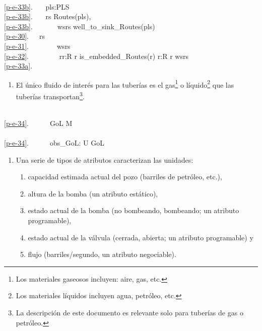 \bp
\>\ \\
\ref{p-e-33b}.\ \ \ {\ALL} pls:PLS {\RDOT}\\
\ref{p-e-33b}.\ \ \  rs {\EQ} Routes(pls),\\
\ref{p-e-33b}.\ \ \ \ \ \ \ wsrs {\EQ} well\_to\_sink\_Routes(pls) \\
\ref{p-e-30}.\ \ \ rs {\EQ} \\
\ref{p-e-31}.\ \ \ \ \ \ \ \ wsrs {\UNION}\\
\ref{p-e-32}.\ \ \ \ \ \ \ \ {\UNION} {\LBRACE}{\LBRACE}r{\PRIM}{\BAR}r{\PRIM}:R {\RDOT} r{\PRIM} {\ISIN} is\_embedded\_Routes(r{\PRIM}{\PRIM}){\RBRACE} {\BAR} r{\PRIM}{\PRIM}:R {\RDOT} r{\PRIM}{\PRIM} {\ISIN} wsrs{\RBRACE}\\
\ref{p-e-33a}.\ \ \ 
\ep
{}

\begin{enumerate}\setei
\item \label{p-e-34} El único fluido de interés para las tuberías es el
                     gas\footnote{\LLLL Los materiales gaseosos incluyen: aire, gas,
                     etc.} o líquido\footnote{\LLLL Los materiales líquidos incluyen
                     agua, petróleo, etc.} que las tuberías
                     transportan\footnote{\LLLL La descripción de este
                     documento es relevante solo para tuberías de gas o petróleo.}.
\savei\end{enumerate}

\bp
\>\ \\
\ref{p-e-34}.\ \ \ \ \ \ GoL {\LBRACKET} {\EQ} M {\RBRACKET} \\
\>\ \\
\ref{p-e-34}.\ \ \ \ \ \ obs\_GoL: U {\RIGHTARROW} GoL\ \ 
\ep

\LLLL

\HHHH %


\begin{enumerate}\setei
\item Una serie de tipos de atributos caracterizan las unidades:
\begin{enumerate}
\item \label{pa01x} capacidad estimada actual del pozo (barriles de petróleo, etc.),
\item \label{pa03x} altura de la bomba (un atributo estático), 
\item \label{pa04x} estado actual de la bomba (no bombeando, bombeando; un atributo programable),
\item \label{pa05x} estado actual de la válvula (cerrada, abierta; un atributo programable) y
\item \label{pa06x} flujo (barriles/segundo, un atributo negociable).
\end{enumerate}
\savei\end{enumerate}

